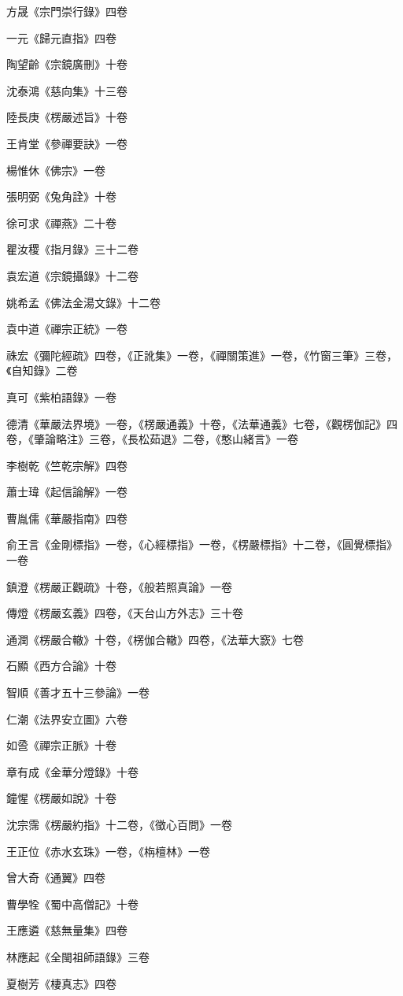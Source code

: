方晟《宗門崇行錄》四卷

一元《歸元直指》四卷

陶望齡《宗鏡廣刪》十卷

沈泰鴻《慈向集》十三卷

陸長庚《楞嚴述旨》十卷

王肯堂《參禪要訣》一卷

楊惟休《佛宗》一卷

張明弼《兔角詮》十卷

徐可求《禪燕》二十卷

瞿汝稷《指月錄》三十二卷

袁宏道《宗鏡攝錄》十二卷

姚希孟《佛法金湯文錄》十二卷

袁中道《禪宗正統》一卷

祩宏《彌陀經疏》四卷，《正訛集》一卷，《禪關策進》一卷，《竹窗三筆》三卷，《自知錄》二卷

真可《紫柏語錄》一卷

德清《華嚴法界境》一卷，《楞嚴通義》十卷，《法華通義》七卷，《觀楞伽記》四卷，《肇論略注》三卷，《長松茹退》二卷，《憨山緒言》一卷

李樹乾《竺乾宗解》四卷

蕭士瑋《起信論解》一卷

曹胤儒《華嚴指南》四卷

俞王言《金剛標指》一卷，《心經標指》一卷，《楞嚴標指》十二卷，《圓覺標指》一卷

鎮澄《楞嚴正觀疏》十卷，《般若照真論》一卷

傳燈《楞嚴玄義》四卷，《天台山方外志》三十卷

通潤《楞嚴合轍》十卷，《楞伽合轍》四卷，《法華大窾》七卷

石顯《西方合論》十卷

智順《善才五十三參論》一卷

仁潮《法界安立圖》六卷

如巹《禪宗正脈》十卷

章有成《金華分燈錄》十卷

鐘惺《楞嚴如說》十卷

沈宗霈《楞嚴約指》十二卷，《徵心百問》一卷

王正位《赤水玄珠》一卷，《栴檀林》一卷

曾大奇《通翼》四卷

曹學牷《蜀中高僧記》十卷

王應遴《慈無量集》四卷

林應起《全閩祖師語錄》三卷

夏樹芳《棲真志》四卷

